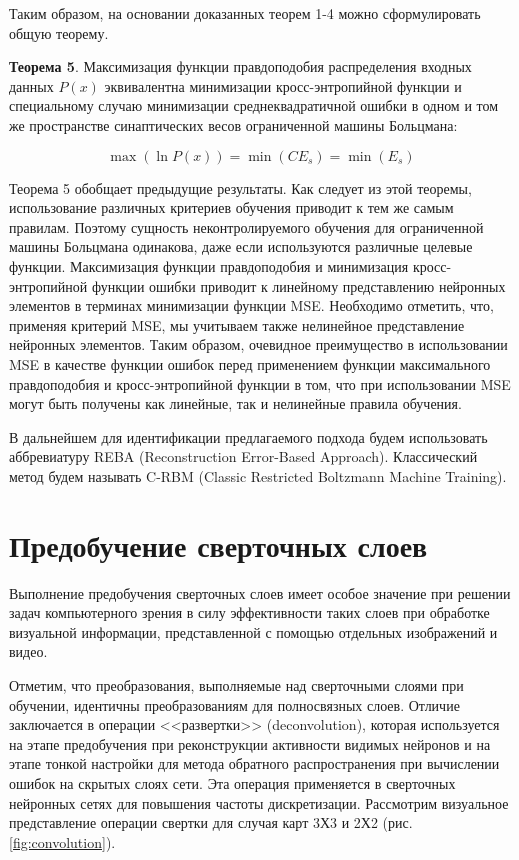 Таким образом, на основании доказанных теорем 1-4 можно сформулировать общую теорему.

\textbf{Теорема 5}. Максимизация функции правдоподобия распределения входных данных $P(x)$ эквивалентна минимизации кросс-энтропийной функции и специальному случаю минимизации среднеквадратичной ошибки в одном и том же пространстве синаптических весов ограниченной машины Больцмана:

\begin{equation}
	\max(\ln P(x)) = \min(CE_s) = \min(E_s)
\end{equation}

Теорема 5 обобщает предыдущие результаты. Как следует из этой теоремы, использование различных критериев обучения приводит к тем же самым правилам. Поэтому сущность неконтролируемого обучения для ограниченной машины Больцмана одинакова, даже если используются различные целевые функции. Максимизация функции правдоподобия и минимизация кросс-энтропийной функции ошибки приводит к линейному представлению нейронных элементов в терминах минимизации функции MSE. Необходимо отметить, что, применяя критерий MSE, мы учитываем также нелинейное представление нейронных элементов. Таким образом, очевидное преимущество в использовании MSE в качестве функции ошибок перед применением функции максимального правдоподобия и кросс-энтропийной функции в том, что при использовании MSE могут быть получены как линейные, так и нелинейные правила обучения.

В дальнейшем для идентификации предлагаемого подхода будем использовать аббревиатуру REBA (Reconstruction Error-Based Approach). Классический метод будем называть C-RBM (Classic Restricted Boltzmann Machine Training).

\section{Предобучение сверточных слоев}

Выполнение предобучения сверточных слоев имеет особое значение при решении задач компьютерного зрения в силу эффективности таких слоев при обработке визуальной информации, представленной с помощью отдельных изображений и видео.

Отметим, что преобразования, выполняемые над сверточными слоями при обучении, идентичны преобразованиям для полносвязных слоев. 
Отличие заключается в операции <<развертки>> (deconvolution), которая используется на этапе предобучения при реконструкции активности видимых нейронов и на этапе тонкой настройки для метода обратного распространения при вычислении ошибок на скрытых слоях сети. Эта операция применяется в сверточных нейронных сетях для повышения частоты дискретизации.
Рассмотрим визуальное представление операции свертки для случая карт 3Х3 и 2Х2 (рис. \ref{fig:convolution}).

